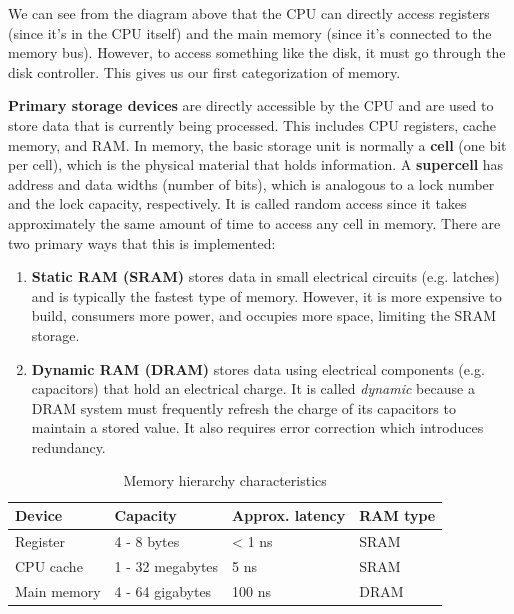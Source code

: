 \documentclass{article}
\begin{document}
    We can see from the diagram above that the CPU can directly access registers (since it's in the CPU itself) and the main memory (since it's connected to the memory bus). However, to access something like the disk, it must go through the disk controller. This gives us our first categorization of memory. 

    \begin{definition}
      \textbf{Primary storage devices} are directly accessible by the CPU and are used to store data that is currently being processed. This includes CPU registers, cache memory, and RAM. In memory, the basic storage unit is normally a \textbf{cell} (one bit per cell), which is the physical material that holds information. A \textbf{supercell} has address and data widths (number of bits), which is analogous to a lock number and the lock capacity, respectively. It is called random access since it takes approximately the same amount of time to access any cell in memory. There are two primary ways that this is implemented:  
      \begin{enumerate}
        \item \textbf{Static RAM (SRAM)} stores data in small electrical circuits (e.g. latches) and is typically the fastest type of memory. However, it is more expensive to build, consumers more power, and occupies more space, limiting the SRAM storage. 
        \item \textbf{Dynamic RAM (DRAM)} stores data using electrical components (e.g. capacitors) that hold an electrical charge. It is called \textit{dynamic} because a DRAM system must frequently refresh the charge of its capacitors to maintain a stored value. It also requires error correction which introduces redundancy. 
      \end{enumerate}

      \begin{table}[H]
        \centering
        \begin{tabular}{|l|l|l|l|}
        \hline
        \textbf{Device} & \textbf{Capacity} & \textbf{Approx. latency} & \textbf{RAM type} \\ \hline
        Register & 4 - 8 bytes & < 1 ns & SRAM \\ \hline
        CPU cache & 1 - 32 megabytes & 5 ns & SRAM \\ \hline
        Main memory & 4 - 64 gigabytes & 100 ns & DRAM \\ \hline
        \end{tabular}
        \caption{Memory hierarchy characteristics}
        \label{tab:memory_hierarchy}
      \end{table}
    \end{definition}
\end{document}
